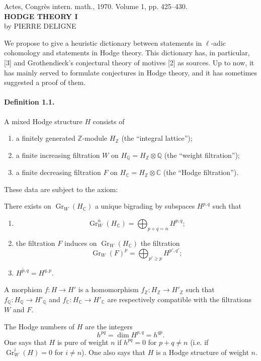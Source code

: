 \documentclass[10pt]{article}
\newcommand{\C}{\mathbb C}
\newcommand{\Q}{\mathbb Q}
\newcommand{\Z}{\mathbb Z}
\newcommand{\Gr}{\operatorname{Gr}}
\begin{document}
\begin{center}
{\small Actes, Congrès intern. math., 1970. Volume 1, pp. 425--430.}\\[4em]
{\Large\bfseries HODGE THEORY I}\\[1.6em]
{\large by PIERRE DELIGNE}
\end{center}

We propose to give a heuristic dictionary between statements in $\ell$-adic cohomology and statements in Hodge theory. This dictionary has, in particular, [3] and Grothendieck's conjectural theory of motives [2] as sources. Up to now, it has mainly served to formulate conjectures in Hodge theory, and it has sometimes suggested a proof of them.

\paragraph{Definition 1.1.} A mixed Hodge structure $H$ consists of
\begin{enumerate}[label=(\alph*)]
\item a finitely generated $\Z$-module $H_\Z$ (the ``integral lattice'');
\item a finite increasing filtration $W$ on $H_\Q=H_\Z\otimes\Q$ (the ``weight filtration'');
\item a finite decreasing filtration $F$ on $H_\C=H_\Z\otimes\C$ (the ``Hodge filtration'').
\end{enumerate}
These data are subject to the axiom:

There exists on $\Gr_W(H_\C)$ a unique bigrading by subspaces $H^{p,q}$ such that
\begin{enumerate}[label=(\roman*)]
\item
\[
\Gr_W^n(H_\C)=\bigoplus_{p+q=n}H^{p,q};
\]
\item the filtration $F$ induces on $\Gr_W(H_\C)$ the filtration
\[
\Gr_W(F)^p=\bigoplus_{p'\ge p}H^{p',q'};
\]
\item $\overline{H^{p,q}}=H^{q,p}$.
\end{enumerate}
A morphism $f:H\to H'$ is a homomorphism $f_\Z:H_\Z\to H'_\Z$ such that $f_\Q:H_\Q\to H'_\Q$ and $f_\C:H_\C\to H'_\C$ are respectively compatible with the filtrations $W$ and $F$.

The Hodge numbers of $H$ are the integers
\[
\tag{1.2}
h^{pq}=\dim H^{p,q}=h^{qp}.
\]
One says that $H$ is pure of weight $n$ if $h^{pq}=0$ for $p+q\ne n$ (i.e. if $\Gr_W^i(H)=0$ for $i\ne n$). One also says that $H$ is a Hodge structure of weight $n$.
\end{document}
